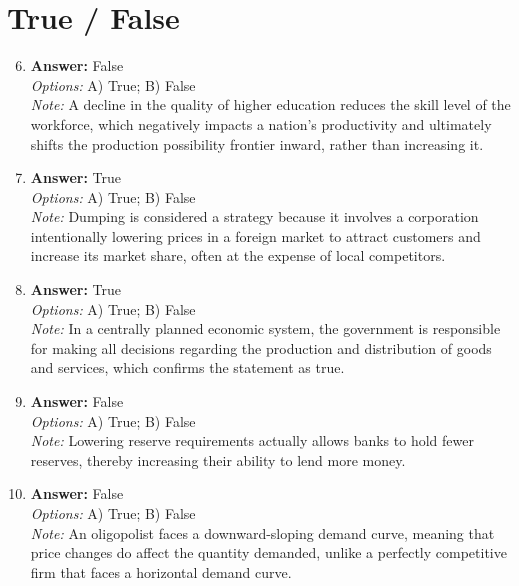 \documentclass[12pt]{article}
\begin{document}
\section*{True / False}
\begin{enumerate}[label=\arabic*.]
\setcounter{enumi}{5}
\item \textbf{Answer:} False
\\ \textit{Options:} A) True; B) False
\\ \textit{Note:} A decline in the quality of higher education reduces the skill level of the workforce, which negatively impacts a nation's productivity and ultimately shifts the production possibility frontier inward, rather than increasing it.
\item \textbf{Answer:} True
\\ \textit{Options:} A) True; B) False
\\ \textit{Note:} Dumping is considered a strategy because it involves a corporation intentionally lowering prices in a foreign market to attract customers and increase its market share, often at the expense of local competitors.
\item \textbf{Answer:} True
\\ \textit{Options:} A) True; B) False
\\ \textit{Note:} In a centrally planned economic system, the government is responsible for making all decisions regarding the production and distribution of goods and services, which confirms the statement as true.
\item \textbf{Answer:} False
\\ \textit{Options:} A) True; B) False
\\ \textit{Note:} Lowering reserve requirements actually allows banks to hold fewer reserves, thereby increasing their ability to lend more money.
\item \textbf{Answer:} False
\\ \textit{Options:} A) True; B) False
\\ \textit{Note:} An oligopolist faces a downward-sloping demand curve, meaning that price changes do affect the quantity demanded, unlike a perfectly competitive firm that faces a horizontal demand curve.
\end{enumerate}
\end{document}
